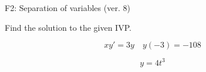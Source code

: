 \begin{exercise}
  \begin{exerciseTitle}F2: Separation of variables (ver. 8)\end{exerciseTitle}
  \begin{exerciseStatement}
    
Find the solution to the given IVP.

    
\[xy'= 3 y \hspace{1em} y( -3 ) = -108\]

  \end{exerciseStatement}
  \begin{exerciseAnswer}
    
\[y= 4 t^ 3\]

  \end{exerciseAnswer}
\end{exercise}